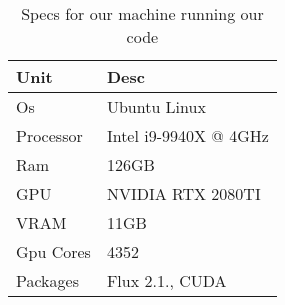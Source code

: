 \begin{table}[h]
\centering
\begin{tabular}{|l|l|}
\hline
\textbf{Unit} & \textbf{Desc}         \\ \hline
Os            & Ubuntu Linux          \\ \hline
Processor     & Intel i9-9940X @ 4GHz \\ \hline
Ram           & 126GB                 \\ \hline
GPU           & NVIDIA RTX 2080TI     \\ \hline
VRAM          & 11GB                  \\ \hline
Gpu Cores     & 4352                  \\ \hline
Packages      & Flux 2.1., CUDA       \\ \hline
\end{tabular}
\label{tab:specs}
\caption{Specs for our machine running our code}
\end{table}